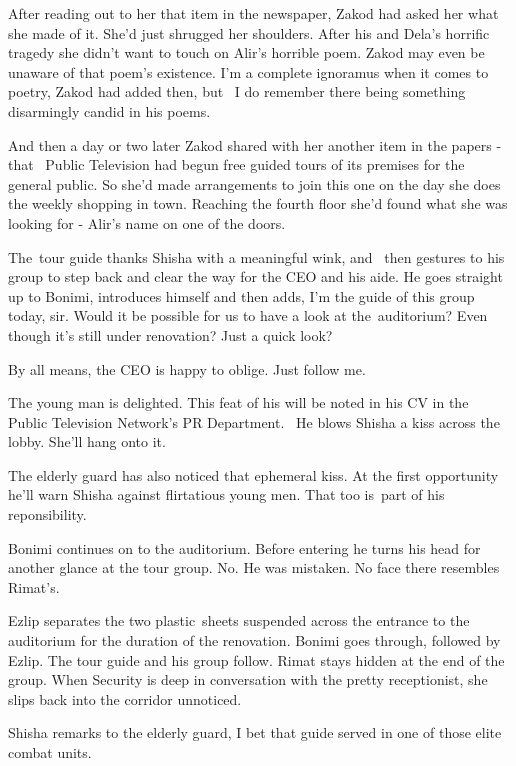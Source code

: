 \documentclass[letterpaper]{article}
\begin{document}
After reading out to her that item in the newspaper, Zakod had asked her what she made of it. She'd just shrugged her
shoulders. After his and Dela's horrific tragedy she didn't want to touch on Alir's horrible poem. Zakod may even be
unaware of that poem's existence. {\textquotedbl}I'm a complete ignoramus when it comes to poetry,{\textquotedbl} Zakod
had added then, {\textquotedbl}but ~I do remember there being something disarmingly candid in his poems{\textquotedbl}.


And then a day or two later Zakod shared with her another item in the papers - that ~Public Television had begun free
guided tours of its premises for the general public. So she'd made arrangements to join this one on the day she does
the weekly shopping in town. Reaching the fourth floor she'd found what she was looking for - Alir's name on one of the
doors.

The~tour guide thanks Shisha with a meaningful wink, and \ then gestures to his group to step back and clear the way for
the CEO and his aide. He goes straight up to Bonimi, introduces himself and then adds, {\textquotedbl} I'm the guide of
this group today, sir. Would it be possible for us to have a look at the~auditorium? Even though it's still under
renovation? Just a quick look?{\textquotedbl} 

{\textquotedbl}By all means,{\textquotedbl} the CEO is happy to oblige. {\textquotedbl}Just follow me.{\textquotedbl}

The young man is delighted. This feat of his will be noted in his CV in the Public Television Network's PR Department.
~He blows Shisha a kiss across the lobby. She'll hang onto it.

The elderly guard has also noticed that ephemeral kiss. \MakeUppercase{A}t the first opportunity he'll warn Shisha
against flirtatious young men. That too is~part of his reponsibility.

Bonimi continues on to the auditorium. Before entering he turns his head for another glance at the tour group. No. He
was mistaken. No face there resembles Rimat's. 

Ezlip separates the two plastic~sheets suspended across the entrance to the auditorium for the duration of the
renovation. Bonimi goes through, followed by Ezlip. The tour guide and his group follow. Rimat stays hidden at the end
of the group. When Security is deep in conversation with the pretty receptionist, she slips back into the corridor
unnoticed.

Shisha remarks to the elderly guard, {\textquotedbl}I bet that guide served in one of those elite combat
units.{\textquotedbl} \ 
\end{document}
